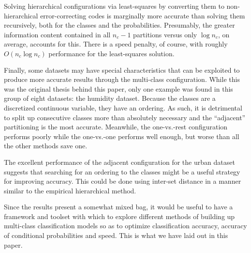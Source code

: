 Solving hierarchical configurations via least-squares by
converting them to non-hierarchical error-correcting codes is marginally more
accurate than solving them recursively, 
both for the classes and the probabilities.
Presumably, the greater information content contained in all $n_c-1$ partitions
versus only $\log n_c$, on average, accounts for this.
There is a speed penalty, of course, with roughly $O(n_c \log n_c)$ performance 
for the least-squares solution.

Finally, some datasets may have special characteristics that can be exploited
to produce more accurate results through the multi-class configuration.
While this was the original thesis behind this paper,
only one example was found in this group of eight datasets: 
the humidity dataset.
Because the classes are a discretized continuous variable, they have an
ordering. As such, it is detrimental to split up consecutive classes more
than absolutely necessary and the ``adjacent'' partitioning is the most
accurate. Meanwhile, the one-vs.-rest configuration performs poorly while
the one-vs.-one performs well enough, but worse than all the other methods
save one.

The excellent performance of the adjacent configuration for the urban
dataset suggests that searching for an ordering to the classes might be a
useful strategy for improving accuracy.
This could be done using inter-set distance in a manner similar to the empirical hierarchical method.

Since the results present a somewhat mixed bag, it would be useful to
have a framework and toolset with which to explore different methods of
building up multi-class classification models so as to optimize classification
accuracy, accuracy of conditional probabilities and speed.
This is what we have laid out in this paper.

